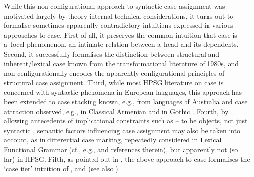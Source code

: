 \documentclass[output=paper]{langsci/langscibook}
\begin{document}
While this non-configurational approach to syntactic case assignment was motivated largely by theory-internal technical considerations, it turns out to formalise sometimes apparently contradictory intuitions expressed in various approaches to case.  First of all, it preserves the common intuition that case is a~local phenomenon, an intimate relation between a~head and its dependents.  Second, it successfully formalises the distinction between structural and inherent/lexical case known from the transformational literature of 1980s, and non-configurationally encodes the apparently configurational principles of structural case assignment.  Third, while most HPSG literature on case is concerned with syntactic phenomena in European languages, this approach has been extended to case stacking known, e.g., from languages of Australia and case attraction observed, e.g., in Classical Armenian and in Gothic \citep{malo:00}.  Fourth, by allowing antecedents of implicational constraints such as – to be  objects, not just syntactic , semantic factors influencing case assignment may also be taken into account, as in differential case marking, repeatedly considered in Lexical Functional Grammar (cf., e.g., \citealt{BHK2003a-u} and references therein), but apparently not (so far) in HPSG\@.  Fifth, as pointed out in \citealt{Prze99,Prze99b}, the above approach to case formalises the ‘case tier’ intuition of \citealt{ZMT85a}, \citealt{YMJ87} and \citealt{mali:93} (see also \citealt{mali:09}).
\end{document}
